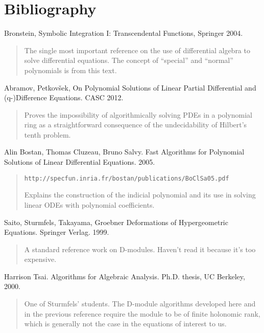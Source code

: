 \documentclass{article}
\begin{document}
\vfill\eject

\section*{Bibliography}

Bronstein, Symbolic Integration I: Transcendental Functions, Springer 2004.

\begin{quote}
The single most important reference on the use of differential
algebra to solve differential equations.  The concept of
``special'' and ``normal'' polynomials is from this text.
\end{quote}

Abramov, Petkov\v sek,
On Polynomial Solutions of Linear Partial
Differential and (q-)Difference Equations.  CASC 2012.

\begin{quote}
Proves the impossibility of algorithmically solving PDEs in a polynomial
ring as a straightforward consequence of the undecidability
of Hilbert's tenth problem.
\end{quote}

Alin Bostan, Thomas Cluzeau, Bruno Salvy.
Fast Algorithms for Polynomial Solutions
of Linear Differential Equations. 2005.

\begin{quote}
{\tt http://specfun.inria.fr/bostan/publications/BoClSa05.pdf}

Explains the construction of the indicial polynomial and its
use in solving linear ODEs with polynomial coefficients.
\end{quote}

Saito, Sturmfels, Takayama, Groebner Deformations of Hypergeometric Equations.
Springer Verlag. 1999.

\begin{quote}
A standard reference work on D-modules.  Haven't read it because it's
too expensive.
\end{quote}

Harrison Tsai.  Algorithms for Algebraic Analysis.  Ph.D. thesis, UC Berkeley, 2000.

\begin{quote}
One of Sturmfels' students.  The D-module algorithms developed here
and in the previous reference require the module to be of finite
holonomic rank, which is generally not the case in the equations
of interest to us.
\end{quote}
\end{document}
